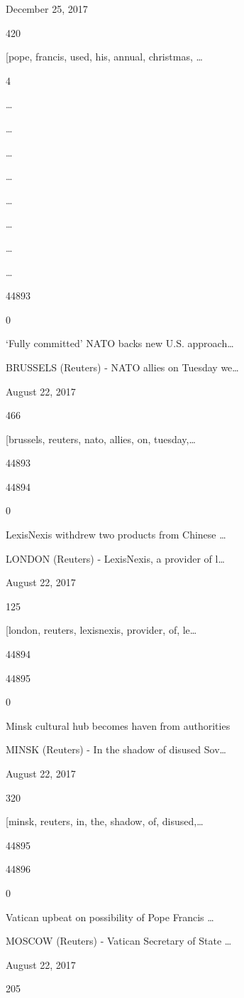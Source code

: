 \documentclass[
  11pt,
  a4paper,
]{article}
\begin{document}
December 25, 2017

420

{[}pope, francis, used, his, annual, christmas, \ldots{}

4

\ldots{}

\ldots{}

\ldots{}

\ldots{}

\ldots{}

\ldots{}

\ldots{}

\ldots{}

44893

0

`Fully committed' NATO backs new U.S. approach\ldots{}

BRUSSELS (Reuters) - NATO allies on Tuesday we\ldots{}

August 22, 2017

466

{[}brussels, reuters, nato, allies, on, tuesday,\ldots{}

44893

44894

0

LexisNexis withdrew two products from Chinese \ldots{}

LONDON (Reuters) - LexisNexis, a provider of l\ldots{}

August 22, 2017

125

{[}london, reuters, lexisnexis, provider, of, le\ldots{}

44894

44895

0

Minsk cultural hub becomes haven from authorities

MINSK (Reuters) - In the shadow of disused Sov\ldots{}

August 22, 2017

320

{[}minsk, reuters, in, the, shadow, of, disused,\ldots{}

44895

44896

0

Vatican upbeat on possibility of Pope Francis \ldots{}

MOSCOW (Reuters) - Vatican Secretary of State \ldots{}

August 22, 2017

205
\end{document}
